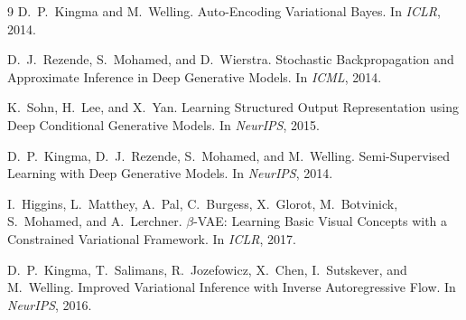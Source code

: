 \documentclass{article}
\begin{document}
\begin{thebibliography}{9}
D.~P.~Kingma and M.~Welling.
\newblock Auto-Encoding Variational Bayes.
\newblock In \emph{ICLR}, 2014.

D.~J.~Rezende, S.~Mohamed, and D.~Wierstra.
\newblock Stochastic Backpropagation and Approximate Inference in Deep Generative Models.
\newblock In \emph{ICML}, 2014.

K.~Sohn, H.~Lee, and X.~Yan.
\newblock Learning Structured Output Representation using Deep Conditional Generative Models.
\newblock In \emph{NeurIPS}, 2015.

D.~P.~Kingma, D.~J.~Rezende, S.~Mohamed, and M.~Welling.
\newblock Semi-Supervised Learning with Deep Generative Models.
\newblock In \emph{NeurIPS}, 2014.

I.~Higgins, L.~Matthey, A.~Pal, C.~Burgess, X.~Glorot, M.~Botvinick, S.~Mohamed, and A.~Lerchner.
\newblock $\beta$-VAE: Learning Basic Visual Concepts with a Constrained Variational Framework.
\newblock In \emph{ICLR}, 2017.

D.~P.~Kingma, T.~Salimans, R.~Jozefowicz, X.~Chen, I.~Sutskever, and M.~Welling.
\newblock Improved Variational Inference with Inverse Autoregressive Flow.
\newblock In \emph{NeurIPS}, 2016.
\end{thebibliography}
\end{document}
